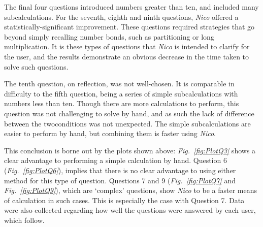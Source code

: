 \documentclass[12pt,twoside,notitlepage,xetex]{report}
\begin{document}
{The final four questions introduced numbers greater than ten, and included many subcalculations.  For the seventh, eighth and ninth questions, \emph{Nico} offered a statistically-significant improvement.  These questions required strategies that go beyond simply recalling number bonds, such as partitioning or long multiplication.  It is these types of questions that \emph{Nico} is intended to clarify for the user, and the results demonstrate an obvious decrease in the time taken to solve such questions.

The tenth question, on reflection, was not well-chosen.  It is comparable in difficulty to the fifth question, being a series of simple subcalculations with numbers less than ten.  Though there are more calculations to perform,  this question was not challenging to solve by hand, and as such the lack of difference between the twoconditions was not unexpected.  The simple subcalculations are easier to perform by hand, but combining them is faster using \emph{Nico}.

This conclusion is borne out by the plots shown above: \emph{Fig.~\ref{fig:PlotQ3}} shows a clear advantage to performing a simple calculation by hand.  Question 6 (\emph{Fig.~\ref{fig:PlotQ6}}), implies that there is no clear advantage to using either method for this type of question.  Questions 7 and 9 (\emph{Fig.~\ref{fig:PlotQ7}} and \emph{Fig.~\ref{fig:PlotQ9}}), which are `complex' questions, show \emph{Nico} to be a faster means of calculation in such cases.  This is especially the case with Question 7.  Data were also collected regarding how well the questions were answered by each user, which follow.

}
\end{document}
